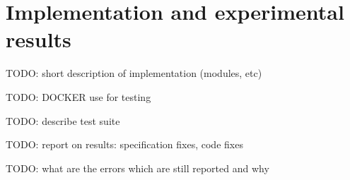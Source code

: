 
\section{Implementation and experimental results}
\label{sec:exp}

TODO: short description of implementation (modules, etc)

TODO: DOCKER use for testing

TODO: describe test suite

TODO: report on results: specification fixes, code fixes

TODO: what are the errors which are still reported and why

